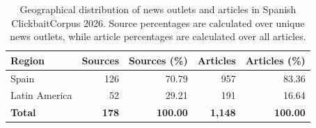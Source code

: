\begin{table}[ht]
\centering
\begin{tabular}{lrrrr}
\toprule
\textbf{Region} & \textbf{Sources} & \textbf{Sources (\%)} & \textbf{Articles} & \textbf{Articles (\%)} \\
\midrule
Spain & 126 & 70.79 & 957 & 83.36 \\
Latin America & 52 & 29.21 & 191 & 16.64 \\
\midrule
\textbf{Total} & \textbf{178} & \textbf{100.00} & \textbf{1,148} & \textbf{100.00} \\
\bottomrule
\end{tabular}
\caption{Geographical distribution of news outlets and articles in Spanish ClickbaitCorpus 2026. Source percentages are calculated over unique news outlets, while article percentages are calculated over all articles.}
\label{tab:geographical-distribution}
\end{table}
